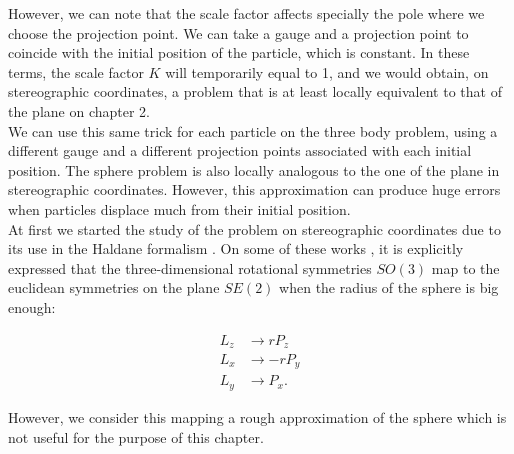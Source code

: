 However, we can note that the scale factor affects specially the pole where we choose the projection point. We can take a gauge and a projection point to coincide with the initial position of the particle, which is constant. In these terms, the scale factor $K$ will temporarily equal to 1, and we would obtain, on stereographic coordinates, a problem that is at least locally equivalent to that of the plane on chapter 2.\\

We can use this same trick for each particle on the three body problem, using a different gauge and a different projection points associated with each initial position. The sphere problem is also locally analogous to the one of the plane in stereographic coordinates. However, this approximation can produce huge errors when particles displace much from their initial position.\\

At first we started the study of the problem on stereographic coordinates due to its use in the Haldane formalism \cite{haldane,haldane2,haldane3}. On some of these works \cite{haldane2,haldane3}, it is explicitly expressed that the three-dimensional rotational symmetries $SO(3)$ map to the euclidean symmetries on the plane $SE(2)$ when the radius of the sphere is big enough:

\begin{align*}
L_z &\to rP_z\\
L_x &\to -rP_y\\
L_y &\to P_x.
\end{align*}

However, we consider this mapping a rough approximation of the sphere which is not useful for the purpose of this chapter.\\




































